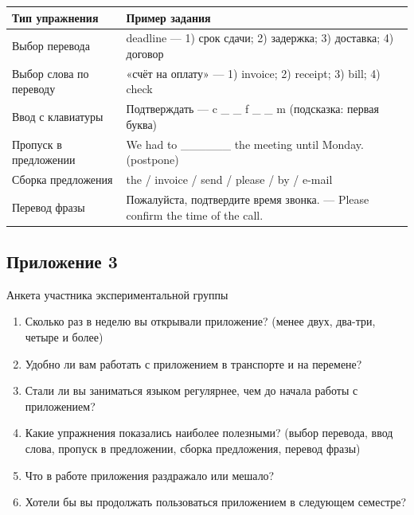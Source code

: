 \documentclass[11pt,a4paper,openany]{report}
\begin{document}
\begin{center}
\small
\begin{tabular}{|p{4.2cm}|p{12.2cm}|}
\hline
Тип упражнения & Пример задания \\
\hline
Выбор перевода & deadline — 1) срок сдачи; 2) задержка; 3) доставка; 4) договор \\
\hline
Выбор слова по переводу & «счёт на оплату» — 1) invoice; 2) receipt; 3) bill; 4) check \\
\hline
Ввод с клавиатуры & Подтверждать — c \_ \_ f \_ \_ m (подсказка: первая буква) \\
\hline
Пропуск в предложении & We had to \_\_\_\_\_\_ the meeting until Monday. (postpone) \\
\hline
Сборка предложения & the / invoice / send / please / by / e-mail \\
\hline
Перевод фразы & Пожалуйста, подтвердите время звонка. — Please confirm the time of the call. \\
\hline
\end{tabular}
\end{center}

\subsection*{Приложение 3}

Анкета участника экспериментальной группы

\begin{enumerate}

  \item Сколько раз в неделю вы открывали приложение? (менее двух, два-три, четыре и более)

  \item Удобно ли вам работать с приложением в транспорте и на перемене?

  \item Стали ли вы заниматься языком регулярнее, чем до начала работы с приложением?

  \item Какие упражнения показались наиболее полезными? (выбор перевода, ввод слова, пропуск в предложении, сборка предложения, перевод фразы)

  \item Что в работе приложения раздражало или мешало?

  \item Хотели бы вы продолжать пользоваться приложением в следующем семестре?

\end{enumerate}
\end{document}
